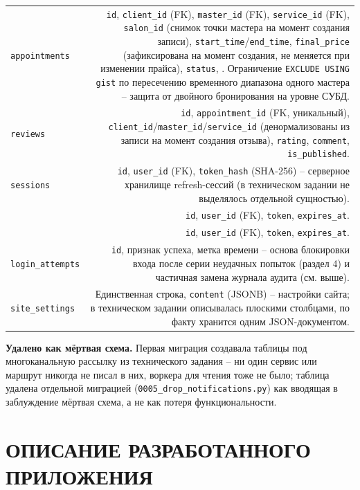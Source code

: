 \begin{xltabular}{\textwidth}{|M|D|}
\texttt{appointments} & \texttt{id}, \texttt{client\_id} (FK),
  \texttt{master\_id} (FK), \texttt{service\_id} (FK), \texttt{salon\_id}
  (снимок точки мастера на момент создания записи),
  \texttt{start\_time}/\texttt{end\_time}, \texttt{final\_price}
  (зафиксирована на момент создания, не меняется при изменении прайса),
  \texttt{status}, .
  Ограничение \texttt{EXCLUDE USING gist}
  по пересечению временного диапазона одного мастера -- защита от
  двойного бронирования на уровне СУБД. \\
\texttt{reviews} & \texttt{id}, \texttt{appointment\_id} (FK,
  уникальный), \texttt{client\_id}/\texttt{master\_id}/\texttt{service\_id}
  (денормализованы из записи на момент создания отзыва),
  \texttt{rating}, \texttt{comment}, \texttt{is\_published}. \\
\texttt{sessions} & \texttt{id}, \texttt{user\_id} (FK),
  \texttt{token\_hash} (SHA-256) -- серверное хранилище
  refresh-сессий (в техническом задании не выделялось отдельной
  сущностью). \\
 & \texttt{id}, \texttt{user\_id} (FK),
  \texttt{token}, \texttt{expires\_at}. \\
 & \texttt{id}, \texttt{user\_id}
  (FK), \texttt{token}, \texttt{expires\_at}. \\
\texttt{login\_attempts} & \texttt{id}, признак успеха, метка времени --
  основа блокировки входа после серии неудачных попыток (раздел 4) и
  частичная замена журнала аудита (см. выше). \\
\texttt{site\_settings} & Единственная строка, \texttt{content}
  (JSONB) -- настройки сайта; в техническом задании описывалась
  плоскими столбцами, по факту хранится одним JSON-документом. \\
\end{xltabular}

\textbf{Удалено как мёртвая схема.} Первая миграция создавала таблицы
 под многоканальную
рассылку из технического задания -- ни один сервис или маршрут никогда не
писал в них, воркера для чтения тоже не было; таблица удалена отдельной
миграцией (\texttt{0005\_drop\_notifications.py}) как вводящая в
заблуждение мёртвая схема, а не как потеря функциональности.

\section{ОПИСАНИЕ РАЗРАБОТАННОГО ПРИЛОЖЕНИЯ}

